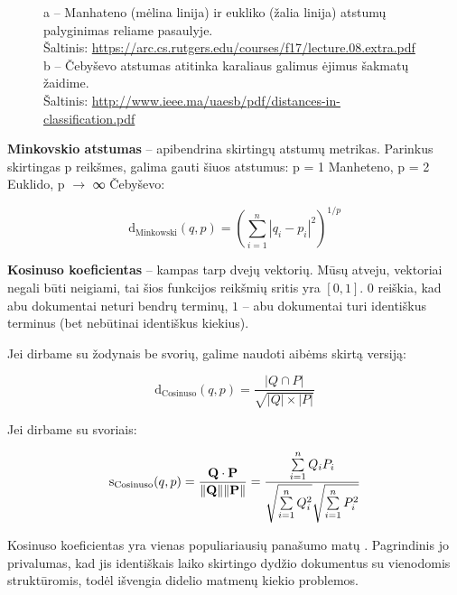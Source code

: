 \documentclass{VUMIFInfKursinis}
\begin{document}
\begin{figure}[H]
\begin{subfigure}[b]{0.4\textwidth}
  \caption{}
  \end{subfigure}
  \caption{a – Manhateno (mėlina linija) ir eukliko (žalia linija) atstumų palyginimas reliame pasaulyje.\\
           Šaltinis: \url{https://arc.cs.rutgers.edu/courses/f17/lecture.08.extra.pdf}\\
           b – Čebyševo atstumas atitinka karaliaus galimus ėjimus šakmatų žaidime.\\
           Šaltinis: \url{http://www.ieee.ma/uaesb/pdf/distances-in-classification.pdf}}
\end{figure}

\textbf{Minkovskio atstumas} – apibendrina skirtingų atstumų metrikas. Parinkus
skirtingas p reikšmes, galima gauti šiuos atstumus: p = 1 Manheteno, p =
2 Euklido, p $\to$ ∞ Čebyševo:

$$ \mathrm{d_{Minkowski}} (q,p)
	= \left(\sum _{i=1}^{n}|q_{i}-p_{i}|^2 \right)^{1/p} $$

\textbf{Kosinuso koeficientas} – kampas tarp dvejų vektorių.
Mūsų atveju, vektoriai negali būti neigiami, tai šios funkcijos reikšmių
sritis yra $[0, 1]$. $0$ reiškia, kad abu dokumentai neturi
bendrų terminų, $1$ – abu dokumentai turi identiškus terminus (bet
nebūtinai identiškus kiekius).

Jei dirbame su žodynais be svorių, galime naudoti aibėms skirtą versiją:

$$ \mathrm{d_{Cosinuso}} (q,p)
	=\frac{|Q \cap P|}{\sqrt{|Q|×|P|}} $$

Jei dirbame su svoriais:

$$ \mathrm{s_{Cosinuso}} (q,p)
	={\mathbf {Q} \cdot \mathbf {P}  \over \|\mathbf {Q} \|\|\mathbf {P} \|}
	={\frac {\sum \limits _{i=1}^{n}{Q_{i}P_{i}}}{{\sqrt {\sum \limits _{i=1}^{n}{Q_{i}^{2}}}}{\sqrt {\sum \limits _{i=1}^{n}{P_{i}^{2}}}}}}$$

Kosinuso koeficientas yra vienas populiariausių panašumo matų \cite{larsen1999fast}.
Pagrindinis jo privalumas, kad jis identiškais laiko skirtingo dydžio
dokumentus su vienodomis struktūromis, todėl išvengia didelio matmenų
kiekio problemos.
\end{document}

